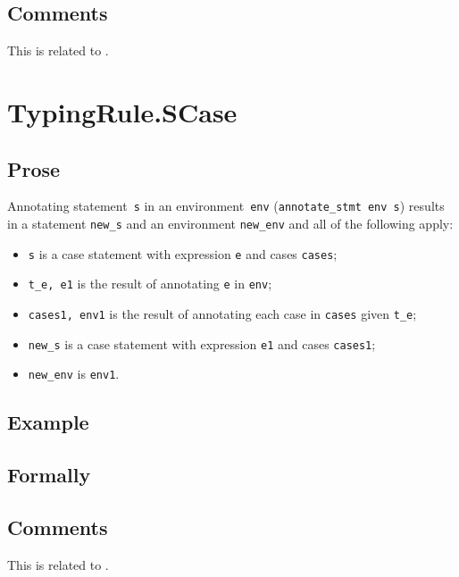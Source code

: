 \documentclass{book}
\begin{document}
\begin{itemize}
\subsection{Comments}
    This is related to .

\section{TypingRule.SCase \label{sec:TypingRule.SCase}}

  \subsection{Prose}
Annotating statement~\texttt{s} in an environment~\texttt{env}
(\texttt{annotate\_stmt env s}) results in a statement \texttt{new\_s} and an
environment \texttt{new\_env} and all of the following apply:
   \begin{itemize}
   \item \texttt{s} is a case statement with expression \texttt{e} and cases \texttt{cases};
   \item \texttt{t\_e, e1} is the result of annotating \texttt{e} in \texttt{env};
   \item \texttt{cases1, env1} is the result of annotating each case in \texttt{cases} given \texttt{t\_e};
   \item \texttt{new\_s} is a case statement with expression \texttt{e1} and cases \texttt{cases1};
   \item \texttt{new\_env} is \texttt{env1}.
   \end{itemize}

  \subsection{Example}



\begin{emptyformal}
    \subsection{Formally}
\end{emptyformal}

\subsection{Comments}
    This is related to .


\end{itemize}
\end{document}
